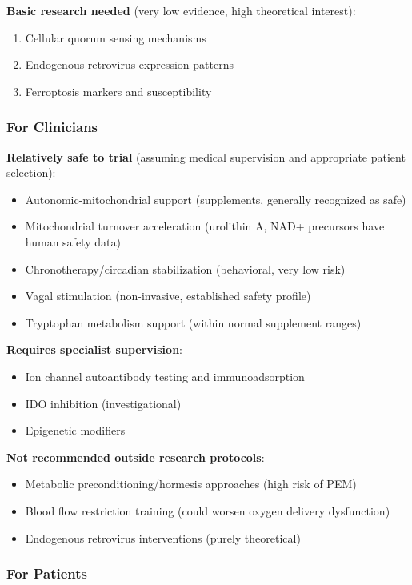 \textbf{Basic research needed} (very low evidence, high theoretical interest):
\begin{enumerate}
    \item Cellular quorum sensing mechanisms
    \item Endogenous retrovirus expression patterns
    \item Ferroptosis markers and susceptibility
\end{enumerate}

\subsubsection{For Clinicians}

\textbf{Relatively safe to trial} (assuming medical supervision and appropriate patient selection):
\begin{itemize}
    \item Autonomic-mitochondrial support (supplements, generally recognized as safe)
    \item Mitochondrial turnover acceleration (urolithin A, NAD+ precursors have human safety data)
    \item Chronotherapy/circadian stabilization (behavioral, very low risk)
    \item Vagal stimulation (non-invasive, established safety profile)
    \item Tryptophan metabolism support (within normal supplement ranges)
\end{itemize}

\textbf{Requires specialist supervision}:
\begin{itemize}
    \item Ion channel autoantibody testing and immunoadsorption
    \item IDO inhibition (investigational)
    \item Epigenetic modifiers
\end{itemize}

\textbf{Not recommended outside research protocols}:
\begin{itemize}
    \item Metabolic preconditioning/hormesis approaches (high risk of PEM)
    \item Blood flow restriction training (could worsen oxygen delivery dysfunction)
    \item Endogenous retrovirus interventions (purely theoretical)
\end{itemize}

\subsubsection{For Patients}

